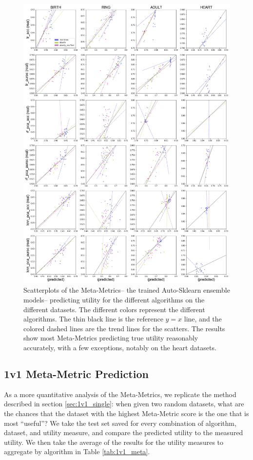\begin{figure}
    \centerfloat
    \includegraphics[width=\textwidth]{project/fig/megametrics-vs-accs_sep_trends.png}
    \caption{Scatterplots of the Meta-Metrics-- the trained Auto-Sklearn ensemble models-- predicting utility for the different algorithms on the different datasets. The different colors represent the different algorithms. The thin black line is the reference $y=x$ line, and the colored dashed lines are the trend lines for the scatters. The results show most Meta-Metrics predicting true utility reasonably accurately, with a few exceptions, notably on the heart datasets.}
    \label{fig:meta_scatter}
\end{figure}


\subsection{1v1 Meta-Metric Prediction}
As a more quantitative analysis of the Meta-Metrics, we replicate the method described in section \ref{sec:1v1_single}: when given two random datasets, what are the chances that the dataset with the highest Meta-Metric score is the one that is most ``useful''? We take the test set saved for every combination of algorithm, dataset, and utility measure, and compare the predicted utility to the measured utility. We then take the average of the results for the utility measures to aggregate by algorithm in Table \ref{tab:1v1_meta}. 


